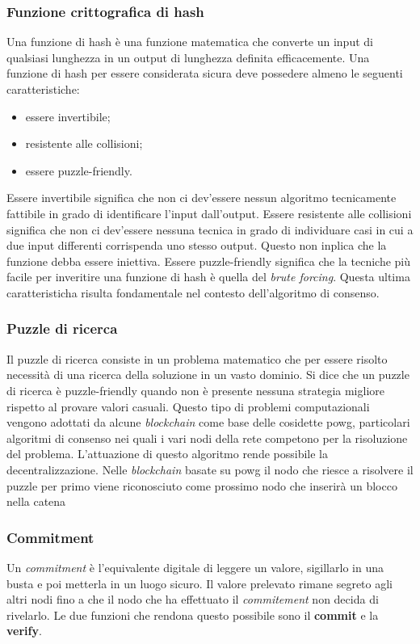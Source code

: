 \subsubsection{Funzione crittografica di hash}
Una funzione di hash è una funzione matematica che converte un input di qualsiasi lunghezza in un output di lunghezza definita efficacemente. Una funzione di hash per essere considerata sicura deve possedere almeno le seguenti caratteristiche:
\begin{itemize}
    \item essere invertibile;
    \item resistente alle collisioni;
    \item essere puzzle-friendly.
\end{itemize}
Essere invertibile significa che non ci dev'essere nessun algoritmo tecnicamente fattibile in grado di identificare l'input dall'output.
Essere resistente alle collisioni significa che non ci dev'essere nessuna tecnica in grado di individuare casi in cui a due input differenti corrispenda uno stesso output. Questo non inplica che la funzione debba essere iniettiva.
Essere puzzle-friendly significa che la tecniche più facile per inveritire una funzione di hash è quella del \emph{brute forcing}. Questa ultima caratteristicha risulta fondamentale nel contesto dell'algoritmo di consenso.

\subsubsection{Puzzle di ricerca}
Il puzzle di ricerca consiste in un problema matematico che per essere risolto necessità di una ricerca della soluzione in un vasto dominio. Si dice che un puzzle di ricerca è puzzle-friendly quando non è presente nessuna strategia migliore rispetto al provare valori casuali. Questo tipo di problemi computazionali vengono adottati da alcune \emph{blockchain} come base delle cosidette \gls{powg}, particolari algoritmi di consenso nei quali i vari nodi della rete competono per la risoluzione del problema. L'attuazione di questo algoritmo rende possibile la decentralizzazione. Nelle \emph{blockchain} basate su \gls{powg} il nodo che riesce a risolvere il puzzle per primo viene riconosciuto come prossimo nodo che inserirà un blocco nella catena 

\subsubsection{Commitment}
Un \emph{commitment} è l'equivalente digitale di leggere un valore, sigillarlo in una busta e poi metterla in un luogo sicuro. Il valore prelevato rimane segreto agli altri nodi fino a che il nodo che ha effettuato il \emph{commitement} non decida di rivelarlo. Le due funzioni che rendona questo possibile sono il \textbf{commit} e la \textbf{verify}.

